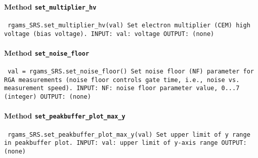 \paragraph{Method \texttt{set_multiplier_hv}}
\vspace{1ex}
\texttt{\newline
rgams_SRS.set_multiplier_hv(val)\newline
\newline
Set electron multiplier (CEM) high voltage (bias voltage).\newline
\newline
INPUT:\newline
val: voltage\newline
\newline
OUTPUT:\newline
(none)\newline
\newline
}

\paragraph{Method \texttt{set_noise_floor}}
\vspace{1ex}
\texttt{\newline
val = rgams_SRS.set_noise_floor()\newline
\newline
Set noise floor (NF) parameter for RGA measurements (noise floor controls gate time, i.e., noise vs. measurement speed).\newline
\newline
INPUT:\newline
NF: noise floor parameter value, 0...7 (integer)\newline
\newline
OUTPUT:\newline
(none)\newline
\newline
}

\paragraph{Method \texttt{set_peakbuffer_plot_max_y}}
\vspace{1ex}
\texttt{\newline
rgams_SRS.set_peakbuffer_plot_max_y(val)\newline
\newline
Set upper limit of y range in peakbuffer plot.\newline
\newline
INPUT:\newline
val: upper limit of y-axis range\newline
\newline
OUTPUT:\newline
(none)\newline
\newline
}

